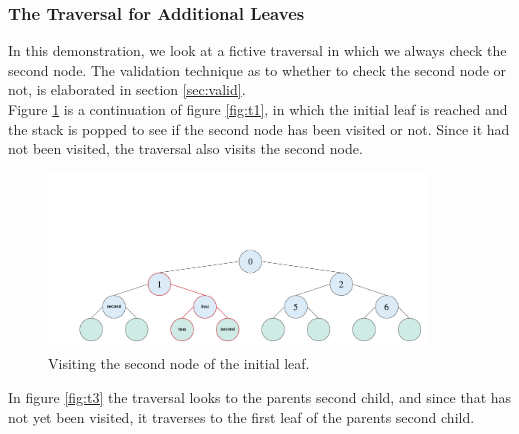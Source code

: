 

\subsubsection{The Traversal for Additional Leaves}


In this demonstration, we look at a fictive traversal in which we always check the second node. The validation technique as to whether to check the second node or not, is elaborated in section \ref{sec:valid}. 
\\[2mm]
Figure \ref{fig:t2} is a continuation of figure \ref{fig:t1}, in which the initial leaf is reached and the stack is popped to see if the second node has been visited or not. Since it had not been visited, the traversal also visits the second node. 





\begin{figure}[H]
\centering
\includegraphics[width=0.9\textwidth]{pics/kd-tree-visual/5.png}
\caption{Visiting the second node of the initial leaf.}
\label{fig:t2}
\end{figure}

\noindent In figure \ref{fig:t3} the traversal looks to the parents second child, and since that has not yet been visited, it traverses to the first leaf of the parents second child.  

